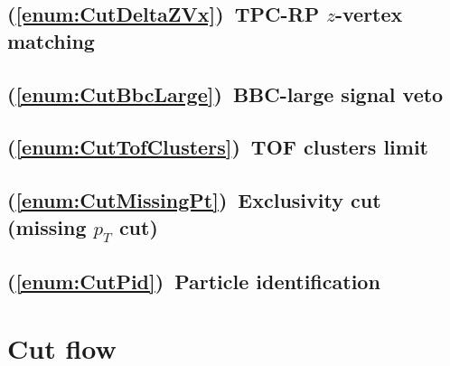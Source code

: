 \subsection{(\ref{enum:CutDeltaZVx})~TPC-RP \texorpdfstring{$z$}{z}-vertex matching}
\subsection{(\ref{enum:CutBbcLarge})~BBC-large signal veto}
\subsection{(\ref{enum:CutTofClusters})~TOF clusters limit}
\subsection{(\ref{enum:CutMissingPt})~Exclusivity cut (missing \texorpdfstring{$p_{T}$}{pT} cut)}
\subsection{(\ref{enum:CutPid})~Particle identification}

\section{Cut flow}\label{sec:cutFlow}